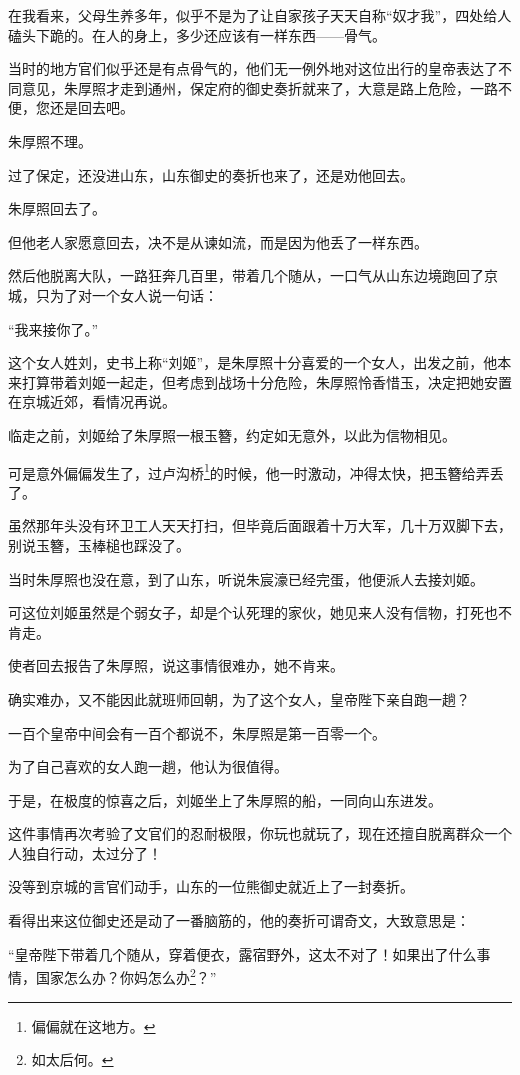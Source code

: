 \begin{multicols}{\theparacolNo}
在我看来，父母生养多年，似乎不是为了让自家孩子天天自称“奴才我”，四处给人磕头下跪的。在人的身上，多少还应该有一样东西——骨气。

当时的地方官们似乎还是有点骨气的，他们无一例外地对这位出行的皇帝表达了不同意见，朱厚照才走到通州，保定府的御史奏折就来了，大意是路上危险，一路不便，您还是回去吧。

朱厚照不理。

过了保定，还没进山东，山东御史的奏折也来了，还是劝他回去。

朱厚照回去了。

但他老人家愿意回去，决不是从谏如流，而是因为他丢了一样东西。

然后他脱离大队，一路狂奔几百里，带着几个随从，一口气从山东边境跑回了京城，只为了对一个女人说一句话：

“我来接你了。”

这个女人姓刘，史书上称“刘姬”，是朱厚照十分喜爱的一个女人，出发之前，他本来打算带着刘姬一起走，但考虑到战场十分危险，朱厚照怜香惜玉，决定把她安置在京城近郊，看情况再说。

临走之前，刘姬给了朱厚照一根玉簪，约定如无意外，以此为信物相见。

可是意外偏偏发生了，过卢沟桥\footnote{偏偏就在这地方。}的时候，他一时激动，冲得太快，把玉簪给弄丢了。

虽然那年头没有环卫工人天天打扫，但毕竟后面跟着十万大军，几十万双脚下去，别说玉簪，玉棒槌也踩没了。

当时朱厚照也没在意，到了山东，听说朱宸濠已经完蛋，他便派人去接刘姬。

可这位刘姬虽然是个弱女子，却是个认死理的家伙，她见来人没有信物，打死也不肯走。

使者回去报告了朱厚照，说这事情很难办，她不肯来。

确实难办，又不能因此就班师回朝，为了这个女人，皇帝陛下亲自跑一趟？

一百个皇帝中间会有一百个都说不，朱厚照是第一百零一个。

为了自己喜欢的女人跑一趟，他认为很值得。

于是，在极度的惊喜之后，刘姬坐上了朱厚照的船，一同向山东进发。

这件事情再次考验了文官们的忍耐极限，你玩也就玩了，现在还擅自脱离群众一个人独自行动，太过分了！

没等到京城的言官们动手，山东的一位熊御史就近上了一封奏折。

看得出来这位御史还是动了一番脑筋的，他的奏折可谓奇文，大致意思是：

“皇帝陛下带着几个随从，穿着便衣，露宿野外，这太不对了！如果出了什么事情，国家怎么办？你妈怎么办\footnote{如太后何。}？”


\end{multicols}
